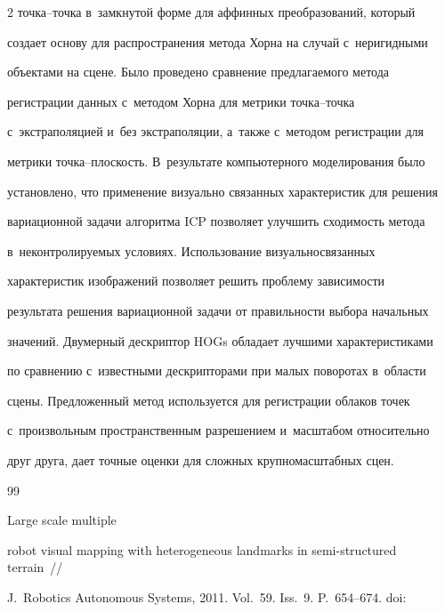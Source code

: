\begin{multicols}{2}
точка--точка в~замк\-ну\-той форме для аффинных преобразований, который 

создает основу для распространения метода Хорна на случай с~неригидными 

объектами на сцене. Было проведено сравнение пред\-ла\-га\-емо\-го метода 

регистрации данных с~методом Хорна для метрики точ\-ка--точ\-ка 

с~экстраполяцией и~без экстраполяции, а~также с~методом регистрации для\linebreak 

метрики точ\-ка--плос\-кость. В~результате компьютерного моделирования было 

установлено, что применение визуально связанных характеристик для решения 

вариационной задачи алгоритма ICP позво\-ля\-ет улучшить сходимость метода 

в~неконтролируемых условиях. Использование визуально\linebreak связанных 

характеристик изображений поз\-во\-ля\-ет решить проб\-ле\-му за\-ви\-си\-мости 

результата решения вариационной задачи от пра\-виль\-ности выбора начальных 

значений. Двумерный дескриптор HOGs обладает лучшими характеристиками 

по сравнению с~известными дескрипторами при малых поворотах в~об\-ласти 

сцены. Предложенный метод используется для регистрации облаков точек 

с~произвольным пространственным разрешением и~масштабом относительно 

друг друга, дает точные оценки для слож\-ных крупномасштабных сцен.

  

{\small\frenchspacing

 {\baselineskip=11.5pt


 \begin{thebibliography}{99}


 Large scale multiple 

robot visual mapping with heterogeneous landmarks in semi-structured terrain~// 

J.~Robotics Autonomous Systems, 2011. Vol.~59. Iss.~9. P.~654--674. doi: 


\end{thebibliography}}}
\end{multicols}
